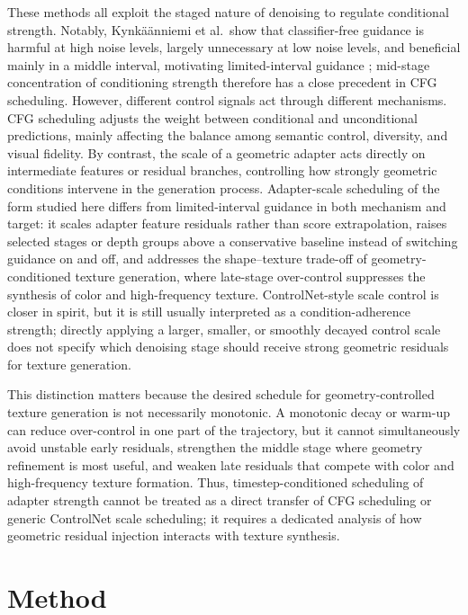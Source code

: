 \documentclass[times,twocolumn,final]{elsarticle}
\begin{document}
These methods all exploit the staged nature of denoising to regulate conditional strength. Notably, Kynk\"a\"anniemi et al.\ show that classifier-free guidance is harmful at high noise levels, largely unnecessary at low noise levels, and beneficial mainly in a middle interval, motivating limited-interval guidance \cite{kynkanniemi2024limited}; mid-stage concentration of conditioning strength therefore has a close precedent in CFG scheduling. However, different control signals act through different mechanisms. CFG scheduling adjusts the weight between conditional and unconditional predictions, mainly affecting the balance among semantic control, diversity, and visual fidelity. By contrast, the scale of a geometric adapter acts directly on intermediate features or residual branches, controlling how strongly geometric conditions intervene in the generation process. Adapter-scale scheduling of the form studied here differs from limited-interval guidance in both mechanism and target: it scales adapter feature residuals rather than score extrapolation, raises selected stages or depth groups above a conservative baseline instead of switching guidance on and off, and addresses the shape--texture trade-off of geometry-conditioned texture generation, where late-stage over-control suppresses the synthesis of color and high-frequency texture. ControlNet-style scale control is closer in spirit, but it is still usually interpreted as a condition-adherence strength; directly applying a larger, smaller, or smoothly decayed control scale does not specify which denoising stage should receive strong geometric residuals for texture generation.

This distinction matters because the desired schedule for geometry-controlled texture generation is not necessarily monotonic. A monotonic decay or warm-up can reduce over-control in one part of the trajectory, but it cannot simultaneously avoid unstable early residuals, strengthen the middle stage where geometry refinement is most useful, and weaken late residuals that compete with color and high-frequency texture formation. Thus, timestep-conditioned scheduling of adapter strength cannot be treated as a direct transfer of CFG scheduling or generic ControlNet scale scheduling; it requires a dedicated analysis of how geometric residual injection interacts with texture synthesis.

\section{Method}
\label{sec:method}
\end{document}
